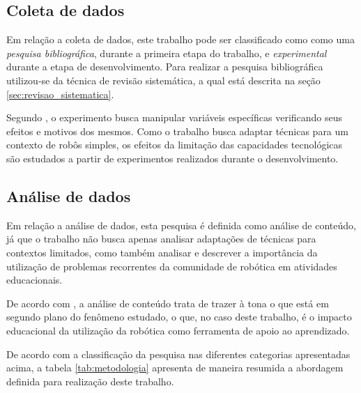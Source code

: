 	\subsection{Coleta de dados} %
	\label{sec:classificação_quanto_à_técnica_de_coleta_de_dados}

		Em relação a coleta de dados, este trabalho pode ser classificado como como uma \textit{pesquisa bibliográfica}, durante a primeira etapa do trabalho, e \textit{experimental} durante a etapa de desenvolvimento. Para realizar a pesquisa bibliográfica utilizou-se da técnica de revisão sistemática, a qual está descrita na seção \ref{sec:revisao_sistematica}.

		Segundo \cite{metodologiaCientifica}, o experimento busca manipular variáveis específicas verificando seus efeitos e motivos dos mesmos. Como o trabalho busca adaptar técnicas para um contexto de robôs simples, os efeitos da limitação das capacidades tecnológicas são estudados a partir de experimentos realizados durante o desenvolvimento.

	\subsection{Análise de dados} %
	\label{sec:classificação_quanto_à_técnica_de_análise_de_dados}
	
		Em relação a análise de dados, esta pesquisa é definida como análise de conteúdo, já que o trabalho não busca apenas analisar adaptações de técnicas para contextos limitados, como também  analisar e descrever a importância da utilização de problemas recorrentes da comunidade de robótica em atividades educacionais. 

		De acordo com \cite{metodologiaCientifica}, a análise de conteúdo trata de trazer à tona o que está em segundo plano do fenômeno estudado, o que, no caso deste trabalho, é o impacto educacional da utilização da robótica como ferramenta de apoio ao aprendizado.

	De acordo com a classificação da pesquisa nas diferentes categorias apresentadas acima, a tabela \ref{tab:metodologia} apresenta de maneira resumida a abordagem definida para realização deste trabalho.

